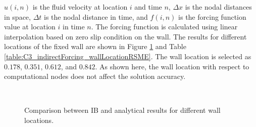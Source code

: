 $u(i, n)$ is the fluid velocity at location $i$ and time $n$, $\Delta x$ is the nodal distances in space, $\Delta t$ is the nodal distance in time, and $f(i,n)$ is the forcing function value at location $i$ in time $n$. The forcing function is calculated using linear interpolation based on zero slip condition on the wall. The results for different locations of the fixed wall are shown in Figure \ref{fig:C3_indirectForcing_wallLocation} and Table \ref{table:C3_indirectForcing_wallLocationRSME}. The wall location is selected as $0.178$, $0.351$, $0.612$, and $0.842$. As shown here, the wall location with respect to computational nodes does not affect the solution accuracy.

\begin{figure}[H]
    \centering
    \quad
    \\
    \quad
    \caption{Comparison between IB and analytical results for different wall locations.}
    \label{fig:C3_indirectForcing_wallLocation}
\end{figure}

